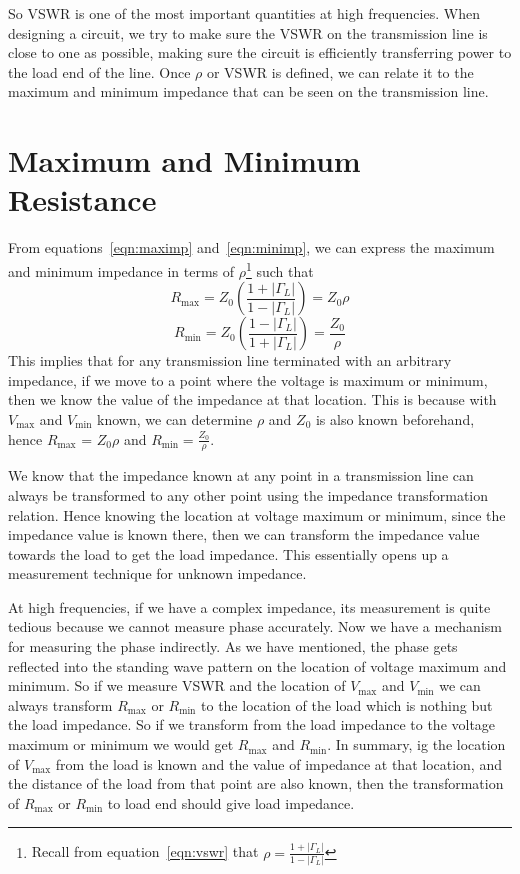 So VSWR is one of the most important quantities at high frequencies. When designing a circuit, we try to make sure the VSWR on the transmission line is close to one as possible, making sure the circuit is efficiently transferring power to the load end of the line. Once $\rho$ or VSWR is defined, we can relate it to the maximum and minimum impedance that can be seen on the transmission line.

\section{Maximum and Minimum Resistance}
From equations~\eqref{eqn:maximp} and~\eqref{eqn:minimp}, we can express the maximum and minimum impedance in terms of $\rho$\footnote{
Recall from equation~\eqref{eqn:vswr} that $\rho = \frac{1 + |\Gamma_L|}{1 - |\Gamma_L|}$
} such that
\begin{dmath}
R_{\max} = Z_0 \left(\frac{1 + |\Gamma_L|}{1 - |\Gamma_L|}\right)
= Z_0\rho
\label{eqn:maximprho}
\end{dmath}
\begin{dmath}
R_{\min} = Z_0 \left(\frac{1 - |\Gamma_L|}{1 + |\Gamma_L|}\right) 
=\frac{Z_0}{\rho}
\label{eqn:minimprho}
\end{dmath}
This implies that for any transmission line terminated with an arbitrary impedance, if we move to a point where the voltage is maximum or minimum, then we know the value of the impedance at that location. This is because with $V_{\max}$ and $V_{\min}$ known, we can determine $\rho$ and $Z_0$ is also known beforehand, hence $R_{\max}$ = $Z_0 \rho$ and $R_{\min} = \frac{Z_0}{\rho}$.

We know that the impedance known at any point in a transmission line can always be transformed to any other point using the impedance transformation relation. Hence knowing the location at voltage maximum or minimum, since the impedance value is known there, then we can transform the impedance value towards the load to get the load impedance. This essentially opens up a measurement technique for unknown impedance.

At high frequencies, if we have a complex impedance, its measurement is quite tedious because we cannot measure phase accurately. Now we have a mechanism for measuring the phase indirectly. As we have mentioned, the phase gets reflected into the standing wave pattern on the location of voltage maximum and minimum. So if we measure VSWR and the location of $V_{\max}$ and $V_{\min}$ we can always transform $R_{\max}$ or $R_{\min}$ to the location of the load which is nothing but the load impedance. So if we transform from the load impedance to the voltage maximum or minimum we would get $R_{\max}$ and $R_{\min}$. In summary, ig the location of $V_{\max}$ from the load is known and the value of impedance at that location, and the distance of the load from that point are also known, then the transformation of $R_{\max}$ or $R_{\min}$ to load end should give load impedance.

